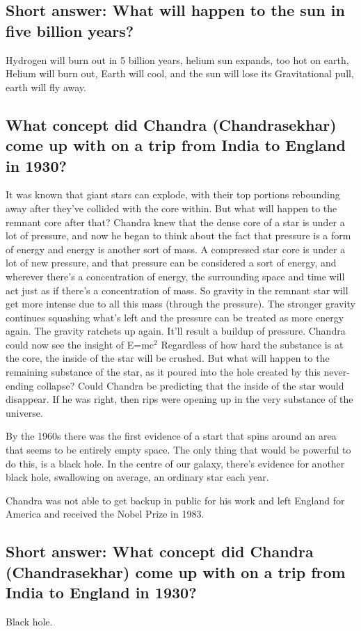 \subsection*{Short answer: What will happen to the sun in five billion years?}
Hydrogen will burn  out in 5 billion years, helium sun expands, too hot on earth, Helium will burn out, Earth will cool, and the sun will lose its Gravitational pull, earth will fly away.

\subsection*{What concept did Chandra (Chandrasekhar) come up with on a trip from India to England in 1930?}
It was known that giant stars can explode, with their top portions rebounding away after they've collided with the core within. But what will happen to the remnant core after that?
Chandra knew that the dense core of a star is under a lot of pressure, and now he began to think about the fact that pressure is a form of energy and energy is another sort of mass.
A compressed star core is under a lot of new pressure, and that pressure can be considered a sort of energy, and wherever there's a concentration of energy, the surrounding space and time will act just as if there's a concentration of mass. So gravity in the remnant star will get more intense due to all this mass (through the pressure). The stronger gravity continues squashing what's left and the pressure can be treated as more energy again. The gravity ratchets up again. It'll result a buildup of pressure. Chandra could now see the insight of E=mc$^2$
Regardless of how hard the substance is at the core, the inside of the star will be crushed. But what will happen to the remaining substance of the star, as it poured into the hole created by this never-ending collapse? Could Chandra be predicting that the inside of the star would disappear. If he was right, then rips were opening up in the very substance of the universe.

By the 1960s there was the first evidence of a start that spins around an area that seems to be entirely empty space. The only thing that would be powerful to do this, is a black hole. In the centre of our galaxy, there's evidence for another black hole, swallowing on average, an ordinary star each year.

Chandra was not able to get backup in public for his work and left England for America and received the Nobel Prize in 1983.

\subsection*{Short answer: What concept did Chandra (Chandrasekhar) come up with on a trip from India to England in 1930?}
Black hole.

